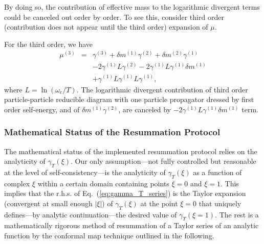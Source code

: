 \documentclass[%
 reprint,
superscriptaddress,
 amsmath,amssymb,
 aps,
prx,
]{revtex4-2}
\newcommand{\txc}{\text{c}}
\newcommand{\psp}{\mu} %
\begin{document}
\begin{appendices}
By doing so, the contribution of effective mass to the logarithmic
divergent terms could be canceled out order by order.
To see this, consider third order (contribution does not appear until the third
order) expansion of $\psp$. 

For the third order, we have
\begin{eqnarray}
  \psp^{(3)}
     &=& \gamma^{(3)} + \delta m^{(1)}\gamma^{(2)} + \delta m^{(2)}\gamma^{(1)}\nonumber\\
            && -2\gamma^{(1)}L\gamma^{(2)}-2\gamma^{(1)}L\gamma^{(1)}\delta m^{(1)}\nonumber \\
            && +\gamma^{(1)}L\gamma^{(1)}L\gamma^{(1)},
\end{eqnarray}
where $L=\ln(\omega_\txc/T)$.
The logarithmic divergent contribution of third order particle-particle
reducible diagram with one particle propagator dressed by first order
self-energy, and of $\delta m^{(1)}\gamma^{(2)}$,  are canceled by 
$-2\gamma^{(1)}L\gamma^{(1)}\delta m^{(1)}$ term.

\subsubsection{Mathematical Status of the Resummation Protocol}
\label{sec:app:math_status}

The mathematical status of the implemented resummation protocol relies on the analyticity of $\gamma_T(\xi)$. Our only assumption---not fully controlled but reasonable at the level of self-consistency---is the analyticity of $\gamma_T(\xi)$ as a function of complex $\xi$ within a certain domain containing points $\xi=0$ and $\xi=1$. This implies that the r.h.s. of Eq.~(\ref{eq:gamma_T_series}) is the Taylor expansion (convergent at small enough $|\xi|$) of $\gamma_T(\xi)$ at the point $\xi=0$ that uniquely defines---by analytic continuation---the desired value of $\gamma_T(\xi =1)$. The rest is a mathematically rigorous method of resummation of a Taylor series of an analytic function by the conformal map technique outlined in the following. 


\end{appendices}
\end{document}
